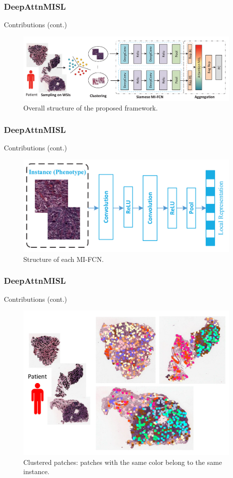 \documentclass{beamer}
\begin{document}
	\begin{frame}
		\frametitle{DeepAttnMISL}
		Contributions (cont.)
		\begin{figure}[H]
			\centering
			\includegraphics[scale=0.12]{figures/full.png}
			\caption{Overall structure of the proposed framework.}
			\label{fig:full}
		\end{figure}
	\end{frame}
	
	\begin{frame}
		\frametitle{DeepAttnMISL}
		Contributions (cont.) 
		
		\begin{figure}[H]
			\centering
			\includegraphics[scale=0.20]{figures/part.png}
			\caption{Structure of each MI-FCN.}
			\label{fig:part}
		\end{figure}
	\end{frame}
	
	\begin{frame}
		\frametitle{DeepAttnMISL}
		Contributions (cont.)
		
		\begin{figure}[H]
			\centering
			\includegraphics[scale=0.14]{figures/cluster.png}
			\caption{Clustered patches: patches with the same color belong to the same instance.}
			\label{fig:cluster}
		\end{figure}
	\end{frame}
\end{document}
